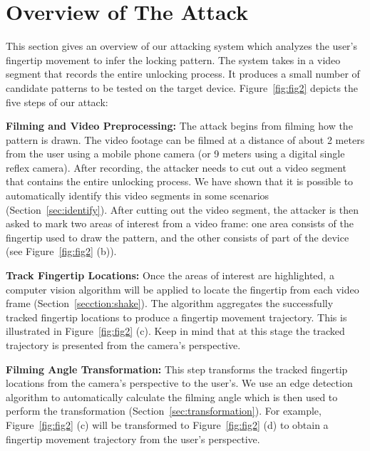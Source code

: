 \section{Overview of The Attack}
\label{section:overview}
     This section gives an overview of our attacking system which analyzes the user's fingertip movement to infer the locking pattern. The system takes in a video segment that records the entire unlocking process. It produces a small number of candidate patterns to be tested on the target device.
    Figure~\ref{fig:fig2} depicts the five steps of our attack:

    \vspace{2mm}
    \noindent {} \textbf{Filming and Video Preprocessing:} The attack begins from
        filming how the pattern is drawn. The video footage can be filmed at a distance of
        about 2 meters from the user using a mobile phone camera (or 9 meters using a digital single reflex camera). After recording, the attacker
        needs to cut out a video segment that contains the entire unlocking
        process. We have shown that it is possible to automatically identify this video segments in some scenarios (Section~\ref{sec:identify}).
        After cutting out the video segment, the attacker is then asked to mark two areas of interest from a video frame: one area consists of
        the fingertip used to draw the pattern, and the other consists of part of the device (see
    Figure~\ref{fig:fig2} (b)).

     \vspace{2mm}
    \noindent {}  \textbf{Track Fingertip Locations:} Once the areas of interest are highlighted, a computer vision algorithm will be applied
        to locate the fingertip from each video frame (Section~\ref{secction:shake}). The algorithm aggregates the successfully tracked fingertip locations to produce a fingertip movement trajectory.
        This is illustrated in Figure~\ref{fig:fig2} (c). Keep in mind that at this stage the tracked trajectory is presented from the camera's perspective.

     \vspace{2mm}
    \noindent {} \textbf{Filming Angle Transformation:}  This step transforms the tracked fingertip locations from the camera's perspective to the user's.
    We use an edge detection algorithm to automatically calculate the filming angle which is then used to perform the transformation (Section~\ref{sec:transformation}).
    For example, Figure~\ref{fig:fig2} (c) will be transformed to Figure~\ref{fig:fig2} (d) to obtain a fingertip movement trajectory from the user's perspective.

